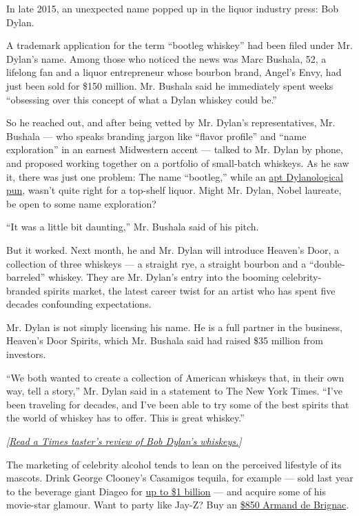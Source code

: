 In late 2015, an unexpected name popped up in the liquor industry press:
Bob Dylan.

A trademark application for the term ``bootleg whiskey'' had been filed
under Mr. Dylan's name. Among those who noticed the news was Marc
Bushala, 52, a lifelong fan and a liquor entrepreneur whose bourbon
brand, Angel's Envy, had just been sold for \$150 million. Mr. Bushala
said he immediately spent weeks ``obsessing over this concept of what a
Dylan whiskey could be.''

So he reached out, and after being vetted by Mr. Dylan's
representatives, Mr. Bushala --- who speaks branding jargon like
``flavor profile'' and ``name exploration'' in an earnest Midwestern
accent --- talked to Mr. Dylan by phone, and proposed working together
on a portfolio of small-batch whiskeys. As he saw it, there was just one
problem: The name ``bootleg,'' while an
\href{https://www.rollingstone.com/music/news/the-10-best-bob-dylan-bootlegs-20110511}{apt
Dylanological pun}, wasn't quite right for a top-shelf liquor. Might Mr.
Dylan, Nobel laureate, be open to some name exploration?

``It was a little bit daunting,'' Mr. Bushala said of his pitch.

But it worked. Next month, he and Mr. Dylan will introduce Heaven's
Door, a collection of three whiskeys --- a straight rye, a straight
bourbon and a ``double-barreled'' whiskey. They are Mr. Dylan's entry
into the booming celebrity-branded spirits market, the latest career
twist for an artist who has spent five decades confounding expectations.

Mr. Dylan is not simply licensing his name. He is a full partner in the
business, Heaven's Door Spirits, which Mr. Bushala said had raised \$35
million from investors.

``We both wanted to create a collection of American whiskeys that, in
their own way, tell a story,'' Mr. Dylan said in a statement to The New
York Times. ``I've been traveling for decades, and I've been able to try
some of the best spirits that the world of whiskey has to offer. This is
great whiskey.''

\emph{{[}}\href{https://www.nytimes3xbfgragh.onion/2018/04/28/business/dylan-whiskey-taste-test.html}{\emph{Read
a Times taster's review of Bob Dylan's whiskeys.}}\emph{{]}}

The marketing of celebrity alcohol tends to lean on the perceived
lifestyle of its mascots. Drink George Clooney's Casamigos tequila, for
example --- sold last year to the beverage giant Diageo for
\href{https://www.nytimes3xbfgragh.onion/2017/06/21/business/george-clooney-tequila-casamigos-diageo.html}{up
to \$1 billion} --- and acquire some of his movie-star glamour. Want to
party like Jay-Z? Buy an
\href{https://www.bloomberg.com/news/articles/2017-04-03/jay-z-s-new-champagne-costs-850-a-bottle-armand-de-brignac-a2}{\$850
Armand de Brignac}.

